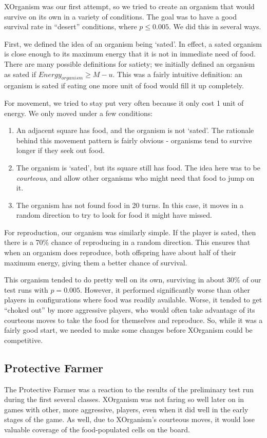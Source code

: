 \documentclass[
10pt, %
letterpaper, %
oneside, %
headinclude,footinclude, %
english
]{article}
\begin{document}
XOrganism was our first attempt, so we tried to create an organism that would survive on its own in a variety of conditions. The goal was to have a good survival rate in ``desert'' conditions, where $p \leq 0.005$. We did this in several ways.

First, we defined the idea of an organism being `sated'. In effect, a sated organism is close enough to its maximum energy that it is not in immediate need of food. There are many possible definitions for satiety; we initially defined an organism as sated if $Energy_{organism} \geq M - u$. This was a fairly intuitive definition: an organism is sated if eating one more unit of food would fill it up completely.

For movement, we tried to stay put very often because it only cost 1 unit of energy. We only moved under a few conditions:
\begin{enumerate}
  \item An adjacent square has food, and the organism is not `sated'. The rationale behind this movement pattern is fairly obvious - organisms tend to survive longer if they seek out food.
  \item The organism is `sated', but its square still has food. The idea here was to be \textit{courteous}, and allow other organisms who might need that food to jump on it.
  \item The organism has not found food in 20 turns. In this case, it moves in a random direction to try to look for food it might have missed.
\end{enumerate}
For reproduction, our organism was similarly simple. If the player is sated, then there is a 70\% chance of reproducing in a random direction. This ensures that when an organism does reproduce, both offspring have about half of their maximum energy, giving them a better chance of survival.

This organism tended to do pretty well on its own, surviving in about 30\% of our test runs with $p=0.005$. However, it performed significantly worse than other players in configurations where food was readily available. Worse, it tended to get ``choked out'' by more aggressive players, who would often take advantage of its courteous moves to take the food for themselves and reproduce. So, while it was a fairly good start, we needed to make some changes before XOrganism could be competitive.

\subsection{Protective Farmer}
The Protective Farmer was a reaction to the results of the preliminary test run during the first several classes. XOrganism was not faring so well later on in games with other, more aggressive, players, even when it did well in the early stages of the game. As well, due to XOrganism's courteous moves, it would lose valuable coverage of the food-populated cells on the board.
\end{document}
